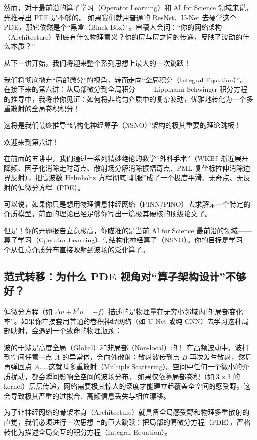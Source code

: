 \documentclass[12pt]{article}
\begin{document}
{然而，对于最前沿的算子学习（Operator Learning）和 AI for Science 领域来说，光推导出 PDE 是不够的。
如果我们就用普通的 ResNet、U-Net 去硬学这个 PDE，那它依然是个“黑盒（Black Box）”。审稿人会问：“你的网络架构（Architecture）到底有什么物理意义？你的层与层之间的传递，反映了波动的什么本质？”

从下一讲开始，我们将迎来整个系列思想上最大的一次跳跃！

我们将彻底抛弃“局部微分”的视角，转而走向“全局积分（Integral Equation）”。在接下来的第六讲：从局部微分到全局积分 —— Lippmann-Schwinger 积分方程的推导中，我将带你见证：如何将非均匀介质中的复杂波动，优雅地转化为一个多重散射的全局卷积积分！

这将是我们最终推导“结构化神经算子（NSNO）”架构的极其重要的理论跳板！




欢迎来到第六讲！

在前面的五讲中，我们通过一系列精妙绝伦的数学“外科手术”（WKBJ 渐近展开降频、因子化消除走时奇点、散射场分解消除振幅奇点、PML 复坐标拉伸消除边界反射），把高波数 Helmholtz 方程彻底“驯服”成了一个极度平滑、无奇点、无反射的偏微分方程（PDE）。

可以说，如果你只是想用物理信息神经网络（PINN/PINO）去求解某一个特定的介质模型，前面的理论已经足够你写出一篇极其硬核的顶级论文了。

但是！你的开题报告立意极高，你瞄准的是当前 AI for Science 最前沿的领域——算子学习（Operator Learning）与结构化神经算子（NSNO）。你的目标是学习一个从任意介质分布直接映射到波场的泛化算子。

\subsection{范式转移：为什么 PDE 视角对“算子架构设计”不够好？}

偏微分方程（如 $\Delta u + k^2 u = -f$）描述的是物理量在无穷小邻域内的“局部变化率”。如果你直接套用普通的卷积神经网络（如 U-Net 或纯 CNN）去学习这种局部映射，会遇到一个致命的物理瓶颈：

波的干涉是高度全局（Global）和非局部（Non-local）的！
在高频波动中，波打到空间任意一点 $A$ 的异常体，会向外散射；散射波传到点 $B$ 再次发生散射，然后再弹回点 $A$……这就叫多重散射（Multiple Scattering）。空间中任何一个微小的介质扰动，都会瞬间影响全空间的波场分布。
如果仅依靠局部卷积（如 $3 \times 3$ 的 kernel）层层传递，网络需要极其惊人的深度才能建立起覆盖全空间的感受野。这会导致极其严重的过拟合、高频信息丢失与相位漂移。

为了让神经网络的骨架本身（Architecture）就具备全局感受野和物理多重散射的直觉，我们必须进行一次思想上的巨大跳跃：把局部的偏微分方程（PDE），严格转化为描述全局交互的积分方程（Integral Equation）。

}
\end{document}

